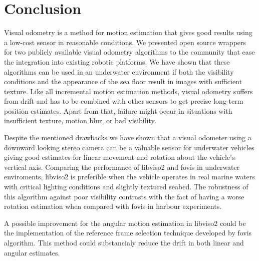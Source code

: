 \documentclass[conference]{IEEEtran}
\begin{document}
\section{Conclusion
  \label{conclusion}
}

Visual odometry is a method for motion estimation that gives good results using a low-cost sensor in reasonable conditions. We presented open source wrappers for two publicly available visual odometry algorithms to the community that ease the integration into existing robotic platforms.
We have shown that these algorithms can be used in an underwater environment if both the visibility conditions and the appearance of the sea floor result in images with sufficient texture. Like all incremental motion estimation methods, visual odometry suffers from drift and has to be combined with other sensors to get precise long-term position estimates. Apart from that, failure might occur in situations with insufficient texture, motion blur, or bad visibility.

Despite the mentioned drawbacks we have shown that a visual odometer using a downward looking stereo camera can be a valuable sensor for underwater vehicles giving good estimates for linear movement and rotation about the vehicle's vertical axis. Comparing the performance of libviso2 and fovis in underwater enviroments, libviso2 is preferible when the vehicle operates in real marine waters with critical lighting conditions and slightly textured seabed. The robustness of this algorithm against poor visibility contrasts with the fact of having a worse rotation estimation when compared with fovis in harbour experiments.

A possible improvement for the angular motion estimation in libviso2 could be the implementation of the reference frame selection technique developed by fovis algorithm. This method could substancialy reduce the drift in both linear and angular estimates.




\end{document}

